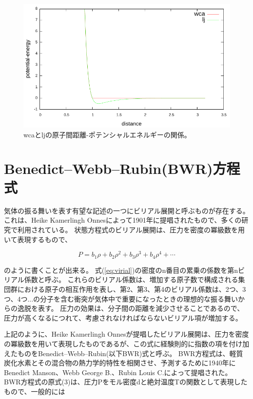 \documentclass[titlepage]{jsreport}
\begin{document}
\begin{figure}[htbp]
    \begin{center}
        \includegraphics[width=15cm]{fig/dis-poen.pdf}
    \end{center}
    \caption{wcaとljの原子間距離-ポテンシャルエネルギーの関係。}
    \label{fig:dis-poen}
\end{figure}


\section{Benedict–Webb–Rubin(BWR)方程式}\label{method-sec:BMR}
気体の振る舞いを表す有望な記述の一つにビリアル展開と呼ぶものが存在する。
これは、Heike Kamerlingh Onnesによって1901年に提唱されたもので\cite{virial-Heike}、多くの研究で利用されている。
状態方程式のビリアル展開は、圧力を密度の冪級数を用いて表現するもので、

\large
\begin{equation}
P=b_1{\rho}+b_2{\rho}^2+b_3{\rho}^3+b_4{\rho}^4+\cdots \label{eq:virial}
\end{equation}

\normalsize
のように書くことが出来る。
式(\ref{eq:virial})の密度のn番目の累乗の係数を第nビリアル係数と呼ぶ\cite{virial-expansion}。
これらのビリアル係数は、増加する原子数で構成される集団群における原子の相互作用を表し、第2、第3、第4のビリアル係数は、2つ、3つ、4つ...の分子を含む衝突が気体中で重要になったときの理想的な振る舞いからの逸脱を表す。
圧力の効果は、分子間の距離を減少させることであるので、圧力が高くなるにつれて、考慮されなければならないビリアル項が増加する\cite{virial-Heike}。

上記のように、Heike Kamerlingh Onnesが提唱したビリアル展開は、圧力を密度の冪級数を用いて表現したものであるが、この式に経験則的に指数の項を付け加えたものをBenedict–Webb–Rubin(以下BWR)式と呼ぶ。
BWR方程式は、軽質炭化水素とその混合物の熱力学的特性を相関させ、予測するために1940年にBenedict Manson、Webb George B.、Rubin Louis C.によって提唱された\cite{BWR-equation:original}。
BWR方程式の原式(3)は、圧力Pをモル密度dと絶対温度Tの関数として表現したもので、一般的には
\end{document}
